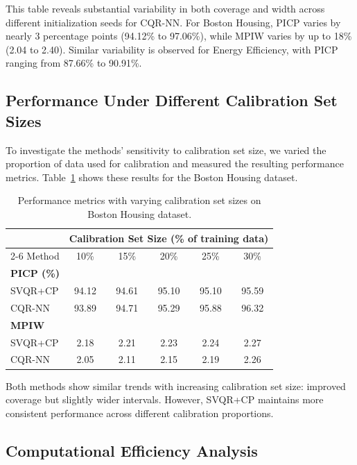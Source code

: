 \documentclass{article}
\begin{document}
This table reveals substantial variability in both coverage and width across different initialization seeds for CQR-NN. For Boston Housing, PICP varies by nearly 3 percentage points (94.12\% to 97.06\%), while MPIW varies by up to 18\% (2.04 to 2.40). Similar variability is observed for Energy Efficiency, with PICP ranging from 87.66\% to 90.91\%.

\subsection{Performance Under Different Calibration Set Sizes}

To investigate the methods' sensitivity to calibration set size, we varied the proportion of data used for calibration and measured the resulting performance metrics. Table~\ref{tab:calibration_size} shows these results for the Boston Housing dataset.

\begin{table}[ht]
  \centering
  \caption{Performance metrics with varying calibration set sizes on Boston Housing dataset.}
  \label{tab:calibration_size}
  \begin{tabular}{lccccc}
    \toprule
    & \multicolumn{5}{c}{Calibration Set Size (\% of training data)} \\
    \cmidrule(lr){2-6}
    Method & 10\% & 15\% & 20\% & 25\% & 30\% \\
    \midrule
    \multicolumn{6}{l}{\textbf{PICP (\%)}} \\
    SVQR+CP & 94.12 & 94.61 & 95.10 & 95.10 & 95.59 \\
    CQR-NN & 93.89 & 94.71 & 95.29 & 95.88 & 96.32 \\
    \midrule
    \multicolumn{6}{l}{\textbf{MPIW}} \\
    SVQR+CP & 2.18 & 2.21 & 2.23 & 2.24 & 2.27 \\
    CQR-NN & 2.05 & 2.11 & 2.15 & 2.19 & 2.26 \\
    \bottomrule
  \end{tabular}
\end{table}

Both methods show similar trends with increasing calibration set size: improved coverage but slightly wider intervals. However, SVQR+CP maintains more consistent performance across different calibration proportions.

\subsection{Computational Efficiency Analysis}
\end{document}
